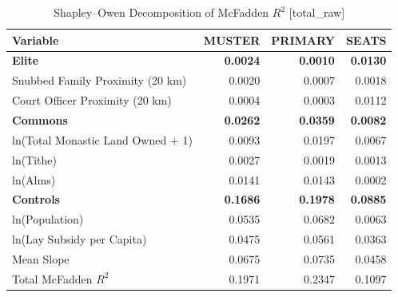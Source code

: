 \begin{table}[H]
\centering
\caption{Shapley--Owen Decomposition of McFadden $R^2$ [total_raw]}
\label{tab:shapley_owen_total_raw}
\begin{tabular}{lrrr}
\hline\hline
Variable & MUSTER & PRIMARY & SEATS \\
\hline
\textbf{Elite} & \textbf{0.0024} & \textbf{0.0010} & \textbf{0.0130} \\
\quad Snubbed Family Proximity (20 km) & 0.0020 & 0.0007 & 0.0018 \\
\quad Court Officer Proximity (20 km) & 0.0004 & 0.0003 & 0.0112 \\
\textbf{Commons} & \textbf{0.0262} & \textbf{0.0359} & \textbf{0.0082} \\
\quad ln(Total Monastic Land Owned + 1) & 0.0093 & 0.0197 & 0.0067 \\
\quad ln(Tithe) & 0.0027 & 0.0019 & 0.0013 \\
\quad ln(Alms) & 0.0141 & 0.0143 & 0.0002 \\
\textbf{Controls} & \textbf{0.1686} & \textbf{0.1978} & \textbf{0.0885} \\
\quad ln(Population) & 0.0535 & 0.0682 & 0.0063 \\
\quad ln(Lay Subsidy per Capita) & 0.0475 & 0.0561 & 0.0363 \\
\quad Mean Slope & 0.0675 & 0.0735 & 0.0458 \\
\hline
Total McFadden $R^2$ & 0.1971 & 0.2347 & 0.1097 \\
\hline\hline
\end{tabular}
\end{table}
